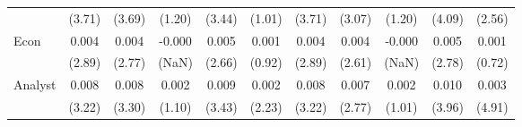 \begin{table}[H]
{\begin{tabular}{lcccccccccc}
   & (3.71) & (3.69) & (1.20) & (3.44) & (1.01) & (3.71) & (3.07) & (1.20) & (4.09) & (2.56) \\ 
  Econ & 0.004 & 0.004 & -0.000 & 0.005 & 0.001 & 0.004 & 0.004 & -0.000 & 0.005 & 0.001 \\ 
   & (2.89) & (2.77) & (NaN) & (2.66) & (0.92) & (2.89) & (2.61) & (NaN) & (2.78) & (0.72) \\ 
  Analyst & 0.008 & 0.008 & 0.002 & 0.009 & 0.002 & 0.008 & 0.007 & 0.002 & 0.010 & 0.003 \\ 
   & (3.22) & (3.30) & (1.10) & (3.43) & (2.23) & (3.22) & (2.77) & (1.01) & (3.96) & (4.91) \\ 
   \hline 
\end{tabular}
}
\end{table}
